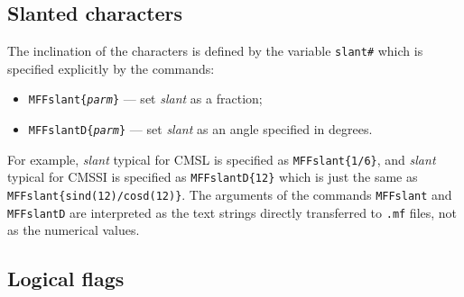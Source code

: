 \subsection{Slanted characters\label{SLANT}}

The inclination of the characters is defined by the
variable {\tt slant\#} which is specified explicitly
by the commands:
\begin{itemize}
\item[]{\tt \bs{}MFFslant\{{\em parm}\}} --- set {\em slant} as a fraction;
\item[]{\tt \bs{}MFFslantD\{{\em parm}\}} --- set {\em slant} as an angle
     specified in degrees.
\end{itemize}
For example, {\em slant} typical for CMSL is specified
as {\tt \bs{}MFFslant\{1/6\}}, and {\em slant} typical for
CMSSI is specified as {\tt \bs{}MFFslantD\{12\}} which is
just the same as {\tt \bs{}MFFslant\{sind(12)/cosd(12)\}}.
The arguments of the commands {\tt\bs{}MFFslant} and {\tt\bs{}MFFslantD}
are interpreted as the text strings directly transferred to
{\tt .mf} files, not as the numerical values.


\subsection{Logical flags\label{FLAGS}}

